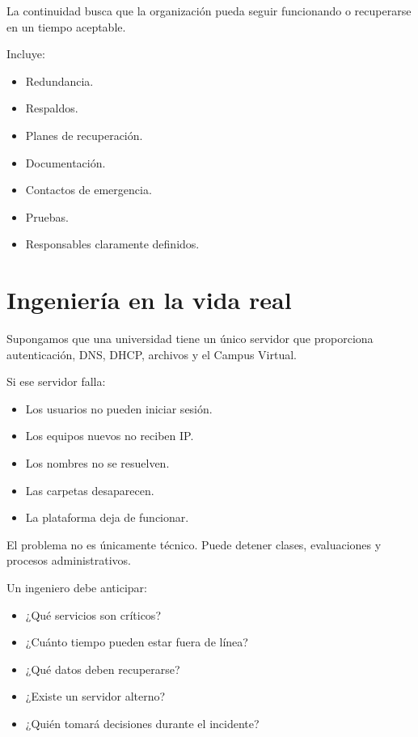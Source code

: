 \documentclass[
  spanish,
  letterpaper,
]{scrbook}
\providecommand{\tightlist}{%
  \setlength{\itemsep}{0pt}\setlength{\parskip}{0pt}}
\begin{document}
La continuidad busca que la organización pueda seguir funcionando o
recuperarse en un tiempo aceptable.

Incluye:

\begin{itemize}
\tightlist
\item
  Redundancia.
\item
  Respaldos.
\item
  Planes de recuperación.
\item
  Documentación.
\item
  Contactos de emergencia.
\item
  Pruebas.
\item
  Responsables claramente definidos.
\end{itemize}


\chapter{Ingeniería en la vida
real}\label{ingenieruxeda-en-la-vida-real-1}

Supongamos que una universidad tiene un único servidor que proporciona
autenticación, DNS, DHCP, archivos y el Campus Virtual.

Si ese servidor falla:

\begin{itemize}
\tightlist
\item
  Los usuarios no pueden iniciar sesión.
\item
  Los equipos nuevos no reciben IP.
\item
  Los nombres no se resuelven.
\item
  Las carpetas desaparecen.
\item
  La plataforma deja de funcionar.
\end{itemize}

El problema no es únicamente técnico. Puede detener clases, evaluaciones
y procesos administrativos.

Un ingeniero debe anticipar:

\begin{itemize}
\tightlist
\item
  ¿Qué servicios son críticos?
\item
  ¿Cuánto tiempo pueden estar fuera de línea?
\item
  ¿Qué datos deben recuperarse?
\item
  ¿Existe un servidor alterno?
\item
  ¿Quién tomará decisiones durante el incidente?
\end{itemize}
\end{document}
